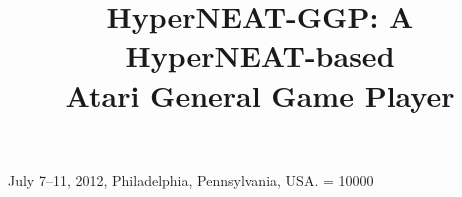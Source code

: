 \documentclass{sig-alternate}
\begin{document}
 {July 7--11, 2012, Philadelphia, Pennsylvania, USA.}
\widowpenalty = 10000
\title{HyperNEAT-GGP: A HyperNEAT-based \\Atari General Game Player}
%
%
%
%
%
\end{document}
